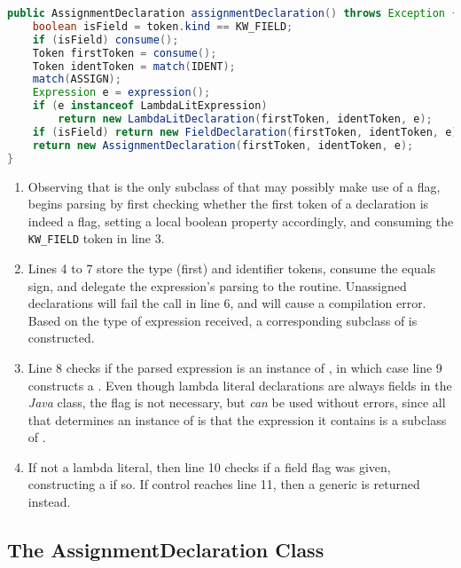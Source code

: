 \begin{lstlisting}[language=Java,caption={Parsing Top-Level Declarations.},label={alg:assign}]
public AssignmentDeclaration assignmentDeclaration() throws Exception {
	boolean isField = token.kind == KW_FIELD;
	if (isField) consume();
	Token firstToken = consume();
	Token identToken = match(IDENT);
	match(ASSIGN);
	Expression e = expression();
	if (e instanceof LambdaLitExpression)
		return new LambdaLitDeclaration(firstToken, identToken, e);
	if (isField) return new FieldDeclaration(firstToken, identToken, e);
	return new AssignmentDeclaration(firstToken, identToken, e);
}
\end{lstlisting}

\begin{enumerate}
	\addtocounter{enumi}{1}
	\item Observing that  is the only subclass of  that may possibly make use of a  flag,  begins parsing by first checking whether the first token of a declaration is indeed a  flag, setting a local boolean property accordingly, and consuming the \texttt{KW\_FIELD} token in line 3.
	\addtocounter{enumi}{1}
	\item Lines 4 to 7 store the type (first) and identifier tokens, consume the equals sign, and delegate the expression's parsing to the  routine. Unassigned declarations will fail the  call in line 6, and will cause a compilation error. Based on the type of expression received, a corresponding subclass of  is constructed.
	\addtocounter{enumi}{3}
	\item Line 8 checks if the parsed expression is an instance of , in which case line 9 constructs a . Even though lambda literal declarations are always fields in the \emph{Java} class, the  flag is not necessary, but \emph{can} be used without errors, since all that determines an instance of  is that the expression it contains is a subclass of .
	\addtocounter{enumi}{1}
	\item If not a lambda literal, then line 10 checks if a field flag was given, constructing a  if so. If control reaches line 11, then a generic  is returned instead.
\end{enumerate}

\subsection{The AssignmentDeclaration Class}

